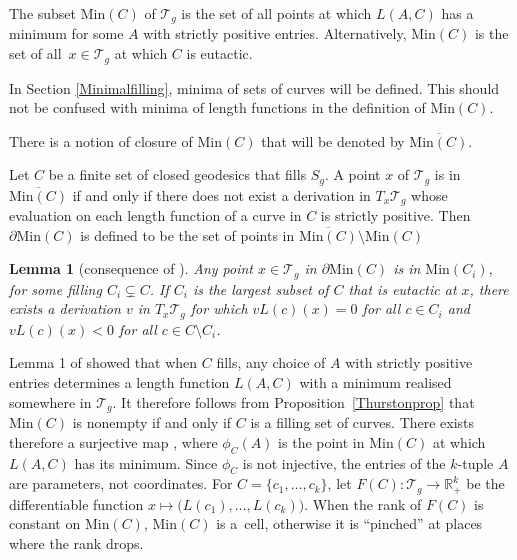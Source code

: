 \documentclass[11pt]{article}
\numberwithin{equation}{section}
\numberwithin{equation}{section}
\newtheorem{Lemma}[Theorem]{Lemma}
\begin{document}
\begin{Definition}
The subset $\mathrm{Min}(C)$ of $\mathcal{T}_{g}$ is the set of all points at which $L(A,C)$ has a minimum for some $A$ with strictly positive entries. Alternatively, $\mathrm{Min}(C)$ is the set of all~${x\in \mathcal{T}_{g}}$ at which $C$ is eutactic.
\end{Definition}


In Section \ref{Minimalfilling}, minima of sets of curves will be defined. This should not be confused with minima of length functions in the definition of $\mathrm{Min}(C)$.

There is a notion of closure of $\mathrm{Min}(C)$ that will be denoted by $\overline{\mathrm{Min}(C)}$.

\begin{Definition}\label{defnmod}
Let $C$ be a finite set of closed geodesics that fills $S_{g}$. A point $x$ of $\mathcal{T}_{g}$ is in $\overline{\mathrm{Min}(C)}$ if and only if there does not exist a derivation in $T_{x}\mathcal{T}_{g}$ whose evaluation on each length function of a curve in $C$ is strictly positive. Then $\partial \mathrm{Min}(C)$ is defined to be the set of points in $\overline{\mathrm{Min}(C)}\setminus \mathrm{Min}(C)$
\end{Definition}

\begin{Lemma}[{consequence of \cite[Lemma 14 and Theorem 15]{SchmutzMorse}}]
\label{lemma14}
Any point $x\in\mathcal{T}_{g}$ in $\partial\mathrm{Min}(C)$ is in $\mathrm{Min}(C_{i})$, for some filling $C_{i}\subsetneq C$. If $C_{i}$ is the largest subset of $C$ that is eutactic at $x$, there exists a derivation $v$ in $T_{x}\mathcal{T}_{g}$ for which $vL(c)(x)=0$ for all $c\in C_{i}$ and $vL(c)(x)<0$ for all $c\in C\setminus C_{i}$.
\end{Lemma}

Lemma 1 of \cite{SchmutzMorse} showed that when $C$ fills, any choice of $A$ with strictly positive entries determines a length function $L(A,C)$ with a minimum realised somewhere in $\mathcal{T}_{g}$. It therefore follows from Proposition~\ref{Thurstonprop} that $\mathrm{Min}(C)$ is nonempty if and only if $C$ is a filling set of curves. There exists therefore a surjective map , where $\phi_{C}(A)$ is the point in $\mathrm{Min}(C)$ at which $L(A,C)$ has its minimum. Since $\phi_{C}$ is not injective, the entries of the $k$-tuple $A$ are parameters, not coordinates. For $C=\{c_{1}, \dots, c_{k}\}$, let $F(C)\colon\mathcal{T}_{g}\rightarrow \mathbb{R}^{k}_{+}$ be the differentiable function $x\mapsto \bigl(L(c_{1}), \dots, L(c_{k})\bigr)$. When the rank of $F(C)$ is constant on $\mathrm{Min}(C)$, $\mathrm{Min}(C)$ is a~cell, otherwise it is ``pinched'' at places where the rank drops.
\end{document}
